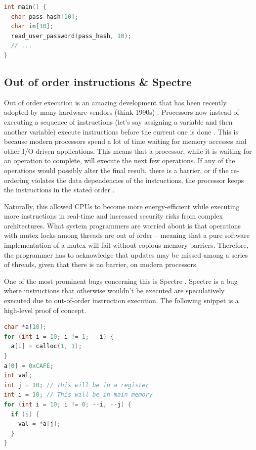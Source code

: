\begin{lstlisting}[language=C]
int main() {
  char pass_hash[10];
  char in[10];
  read_user_password(pass_hash, 10);
  // ...
}
\end{lstlisting}

\subsection{Out of order instructions \& Spectre}

Out of order execution is an amazing development that has been recently adopted by many hardware vendors (think 1990s) .
Processors now instead of executing a sequence of instructions (let's say assigning a variable and then another variable) execute instructions before the current one is done \cite[P. 45]{guide2011intel}.
This is because modern processors spend a lot of time waiting for memory accesses and other I/O driven applications.
This means that a processor, while it is waiting for an operation to complete, will execute the next few operations.
If any of the operations would possibly alter the final result, there is a barrier, or if the re-ordering violates the data dependencies of the instructions, the processor keeps the instructions in the stated order \cite[P. 296]{guide2011intel}.

Naturally, this allowed CPUs to become more energy-efficient while executing more instructions in real-time and increased security risks from complex architectures.
What system programmers are worried about is that operations with mutex locks among threads are out of order -- meaning that a pure software implementation of a mutex will fail without copious memory barriers.
Therefore, the programmer has to acknowledge that updates may be missed among a series of threads, given that there is no barrier, on modern processors.

One of the most prominent bugs concerning this is Spectre \cite{kocher2018spectre}.
Spectre is a bug where instructions that otherwise wouldn't be executed are speculatively executed due to out-of-order instruction execution.
The following snippet is a high-level proof of concept.

\begin{lstlisting}[language=C]
char *a[10];
for (int i = 10; i != 1; --i) {
  a[i] = calloc(1, 1);
}
a[0] = 0xCAFE;
int val;
int j = 10; // This will be in a register
int i = 10; // This will be in main memory
for (int i = 10; i != 0; --i, --j) {
  if (i) {
    val = *a[j];
  }
}
\end{lstlisting}

